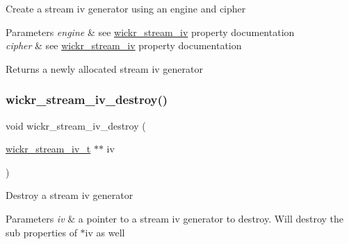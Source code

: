 Create a stream iv generator using an engine and cipher


\begin{DoxyParams}{Parameters}
{\em engine} & see \textquotesingle{}\hyperlink{structwickr__stream__iv}{wickr\+\_\+stream\+\_\+iv}\textquotesingle{} property documentation \\
\hline
{\em cipher} & see \textquotesingle{}\hyperlink{structwickr__stream__iv}{wickr\+\_\+stream\+\_\+iv}\textquotesingle{} property documentation\\
\hline
\end{DoxyParams}
\begin{DoxyReturn}{Returns}
a newly allocated stream iv generator 
\end{DoxyReturn}
\mbox{\label{group__wickr__stream__iv_gad6ac87d891822a866a0d7cad48f79e27}} 
\subsubsection{\texorpdfstring{wickr\+\_\+stream\+\_\+iv\+\_\+destroy()}{wickr\_stream\_iv\_destroy()}}
{\footnotesize\ttfamily void wickr\+\_\+stream\+\_\+iv\+\_\+destroy (\begin{DoxyParamCaption}\item[{\hyperlink{structwickr__stream__iv}{wickr\+\_\+stream\+\_\+iv\+\_\+t} $\ast$$\ast$}]{iv }\end{DoxyParamCaption})}

Destroy a stream iv generator


\begin{DoxyParams}{Parameters}
{\em iv} & a pointer to a stream iv generator to destroy. Will destroy the sub properties of \textquotesingle{}$\ast$iv\textquotesingle{} as well \\
\hline
\end{DoxyParams}
\mbox{\label{group__wickr__stream__iv_gaddcfdc9904ec0ffd32ce8f988aefc484}} 
